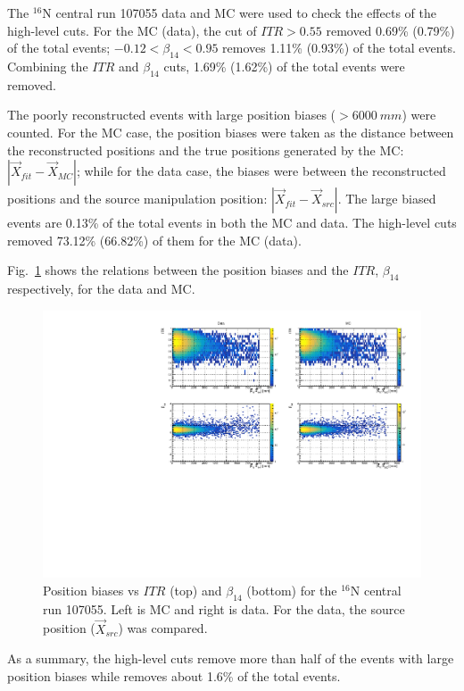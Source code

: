 The $^{16}$N central run 107055 data and MC were used to check the effects of the high-level cuts. For the MC (data), the cut of $ITR>0.55$ removed 0.69\% (0.79\%) of the total events; $-0.12<\beta_{14}<0.95$ removes 1.11\% (0.93\%) of the total events. Combining the $ITR$ and $\beta_{14}$ cuts, 1.69\% (1.62\%) of the total events were removed.

The poorly reconstructed events with large position biases ($>6000~mm$) were counted.
For the MC case, the position biases were taken as the distance between the reconstructed positions and the true positions generated by the MC: $|\vec{X}_{fit}-\vec{X}_{MC}|$; while for the data case, the biases were between the reconstructed positions and the source manipulation position: $|\vec{X}_{fit}-\vec{X}_{src}|$. The large biased events are 0.13\% of the total events in both the MC and data. The high-level cuts removed 73.12\% (66.82\%) of them for the MC (data).

Fig.~\ref{n16_highLevelCut} shows the relations between the position biases and the $ITR$, $\beta_{14}$ respectively, for the data and MC.
\begin{figure}
	\centering
	\includegraphics[width=14cm]{N16_107055_highLevelCuts.pdf}
	\caption[Position biases vs $ITR$ (top) and $\beta_{14}$ (bottom) for the $^{16}$N central run 107055.]{Position biases vs $ITR$ (top) and $\beta_{14}$ (bottom) for the $^{16}$N central run 107055. Left is MC and right is data. For the data, the source position ($\vec{X}_{src}$) was compared.}
	\label{n16_highLevelCut}
\end{figure}

As a summary, the high-level cuts remove more than half of the events with large position biases while removes about 1.6\% of the total events. 

